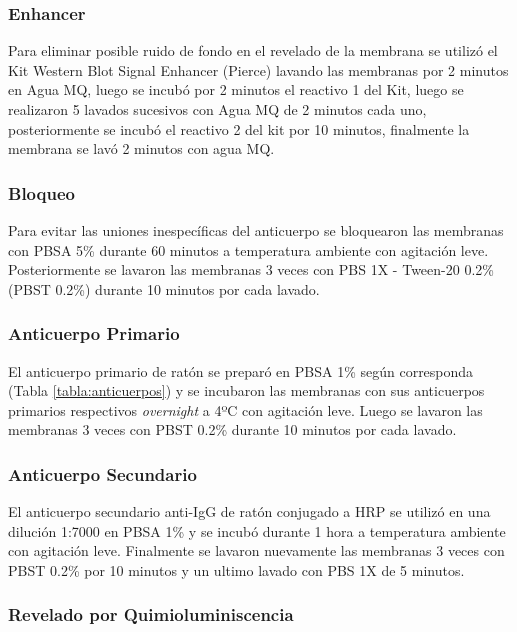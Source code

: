 \documentclass[12pt,a4paper,oneside]{scrbook}
\begin{document}
\subsubsection{Enhancer}

Para eliminar posible ruido de fondo en el revelado de la membrana se
utilizó el Kit Western Blot Signal Enhancer (Pierce) lavando las
membranas por 2 minutos en Agua MQ, luego se incubó por 2 minutos el
reactivo 1 del Kit, luego se realizaron 5 lavados sucesivos con Agua MQ
de 2 minutos cada uno, posteriormente se incubó el reactivo 2 del kit
por 10 minutos, finalmente la membrana se lavó 2 minutos con agua MQ.

\subsubsection{Bloqueo}

Para evitar las uniones inespecíficas del anticuerpo se bloquearon las
membranas con PBSA 5\% durante 60 minutos a temperatura ambiente con
agitación leve. Posteriormente se lavaron las membranas 3 veces con PBS
1X - Tween-20 0.2\% (PBST 0.2\%) durante 10 minutos por cada lavado.

\subsubsection{Anticuerpo Primario}

El anticuerpo primario de ratón se preparó en PBSA 1\% según corresponda
(Tabla \ref{tabla:anticuerpos}) y se incubaron las membranas con sus
anticuerpos primarios respectivos \emph{overnight} a 4ºC con agitación
leve. Luego se lavaron las membranas 3 veces con PBST 0.2\% durante 10
minutos por cada lavado.

\subsubsection{Anticuerpo Secundario}

El anticuerpo secundario anti-IgG de ratón conjugado a HRP se utilizó en
una dilución 1:7000 en PBSA 1\% y se incubó durante 1 hora a temperatura
ambiente con agitación leve. Finalmente se lavaron nuevamente las
membranas 3 veces con PBST 0.2\% por 10 minutos y un ultimo lavado con
PBS 1X de 5 minutos.

\subsubsection{Revelado por Quimioluminiscencia}
\end{document}
